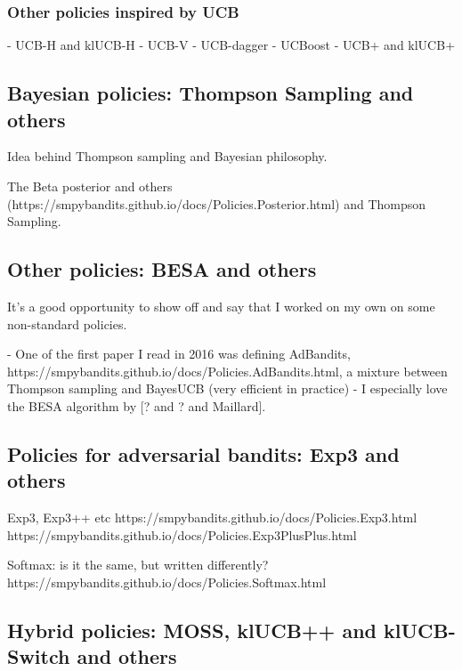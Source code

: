 \subsubsection{Other policies inspired by UCB}

- UCB-H and klUCB-H
- UCB-V
- UCB-dagger
- UCBoost
- UCB+ and klUCB+


\subsection{Bayesian policies: Thompson Sampling and others}

Idea behind Thompson sampling and Bayesian philosophy.

The Beta posterior and others (https://smpybandits.github.io/docs/Policies.Posterior.html) and Thompson Sampling.


\subsection{Other policies: BESA and others}

It's a good opportunity to show off and say that I worked on my own on some non-standard policies.

- One of the first paper I read in 2016 was defining AdBandits, https://smpybandits.github.io/docs/Policies.AdBandits.html, a mixture between Thompson sampling and BayesUCB (very efficient in practice)
- I especially love the BESA algorithm by [? and ? and Maillard].


\subsection{Policies for adversarial bandits: Exp3 and others}

Exp3, Exp3++ etc
https://smpybandits.github.io/docs/Policies.Exp3.html
https://smpybandits.github.io/docs/Policies.Exp3PlusPlus.html

Softmax: is it the same, but written differently?
https://smpybandits.github.io/docs/Policies.Softmax.html


\subsection{Hybrid policies: MOSS, klUCB++ and klUCB-Switch and others}

